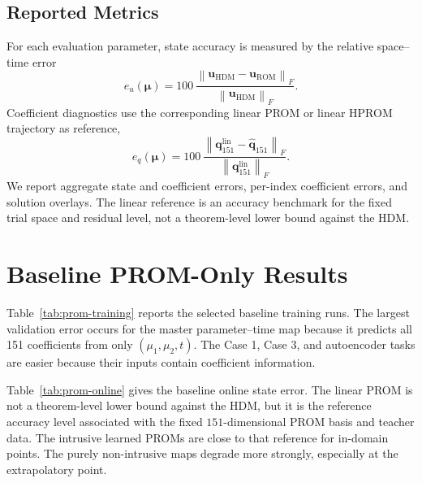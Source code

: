 \documentclass[11pt]{article}
\newcommand{\q}{\mathbf q}
\newcommand{\uvec}{\mathbf u}
\newcommand{\norm}[1]{\left\lVert #1 \right\rVert}
\begin{document}
\subsection{Reported Metrics}
For each evaluation parameter, state accuracy is measured by the relative
space--time error
\begin{equation}
e_u(\bm\mu)=100\,
\frac{\norm{\uvec_{\mathrm{HDM}}-\uvec_{\mathrm{ROM}}}_F}
     {\norm{\uvec_{\mathrm{HDM}}}_F}.
\label{eq:state-error}
\end{equation}
Coefficient diagnostics use the corresponding linear PROM or linear HPROM
trajectory as reference,
\begin{equation}
e_q(\bm\mu)=100\,
\frac{\norm{\q_{151}^{\mathrm{lin}}-\widehat{\q}_{151}}_F}
     {\norm{\q_{151}^{\mathrm{lin}}}_F}.
\label{eq:coefficient-error}
\end{equation}
We report aggregate state and coefficient errors, per-index coefficient
errors, and solution overlays.  The linear reference is an accuracy benchmark
for the fixed trial space and residual level, not a theorem-level lower bound
against the HDM.



\section{Baseline PROM-Only Results}
Table~\ref{tab:prom-training} reports the selected baseline training runs.  The largest validation error occurs for
the master parameter--time map because it predicts all 151 coefficients from only \((\mu_1,\mu_2,t)\).  The Case 1,
Case 3, and autoencoder tasks are easier because their inputs contain coefficient information.

\begin{table}[H]
\centering
\caption{Baseline PROM-only Stage--3 selected networks.  Errors are relative Frobenius percentages in coefficient space.}
\label{tab:prom-training}
\resizebox{\textwidth}{!}{}
\end{table}

Table~\ref{tab:prom-online} gives the baseline online state error.  The linear PROM is not a theorem-level lower
bound against the HDM, but it is the reference accuracy level associated with the fixed \(151\)-dimensional PROM
basis and teacher data.  The intrusive learned PROMs are close to that reference for in-domain points.  The purely
non-intrusive maps degrade more strongly, especially at the extrapolatory point.
\end{document}
